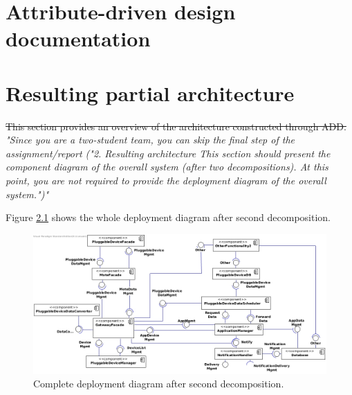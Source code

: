 \documentclass[english]{sareport}
\begin{document}
\maketitle

\tableofcontents

\chapter{Attribute-driven design documentation}\label{sec:add}

\newpage


\chapter{Resulting partial architecture}\label{sec:architecture}
\sout{This section provides an overview of the architecture constructed through ADD.}\\
\textit{"Since you are a two-student team, you can skip the final step of the
assignment/report ("2. Resulting architecture This section should present
the component diagram of the overall system (after two decompositions).
At this point, you are not required to provide the deployment diagram
of the overall system.")"}

\noindent Figure \ref{comp-whole} shows the whole deployment diagram after
second decomposition.

\begin{figure}
    \centering
    \includegraphics[width=1.00\textwidth]{component-diagram-whole}
    \caption{Complete deployment diagram after second decomposition.}\label{comp-whole}
\end{figure}
\end{document}
